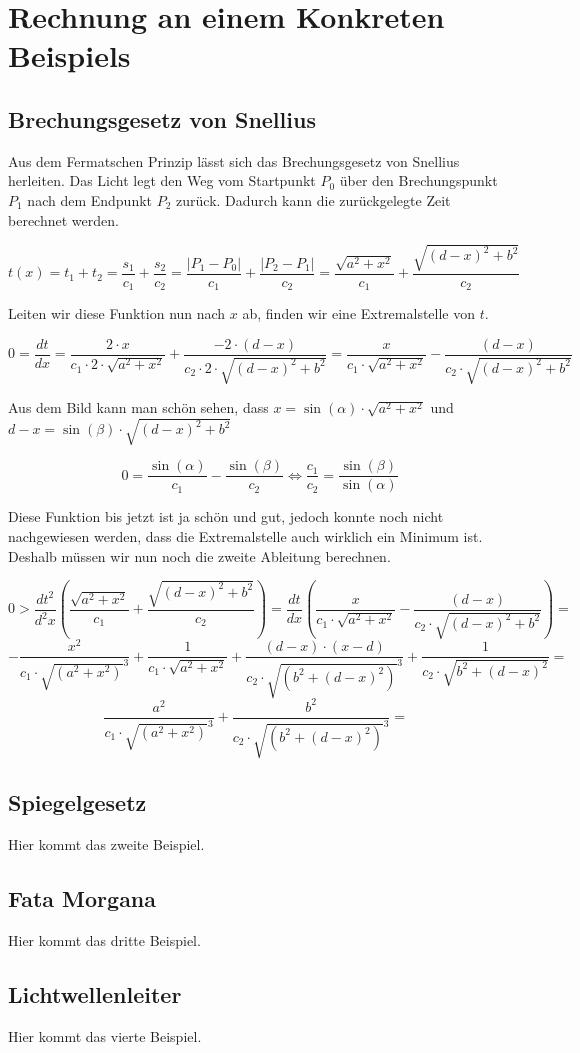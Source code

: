 \section{Rechnung an einem Konkreten Beispiels}

\subsection{Brechungsgesetz von Snellius}
\cite{Snellius}Aus dem Fermatschen Prinzip lässt sich das Brechungsgesetz von Snellius herleiten.
Das Licht legt den Weg vom Startpunkt $P_0$ über den Brechungspunkt $P_1$ 
nach dem Endpunkt $P_2$ zurück. Dadurch kann die zurückgelegte Zeit berechnet werden.



\[
t(x) =
t_1 + t_2 =
\frac{s_1}{c_1} + \frac{s_2}{c_2} =
\frac{|P_1 - P_0|}{c_1} + \frac{|P_2 - P_1|}{c_2} =
\frac{\sqrt{a^2 + x^2}}{c_1} + \frac{\sqrt{(d-x)^2 + b^2}}{c_2}
\]

Leiten wir diese Funktion nun nach $x$ ab, finden wir eine Extremalstelle von $t$.

\[
0 = 
\frac{dt}{dx} =
\frac{2 \cdot x}{c_1 \cdot 2 \cdot \sqrt{a^2 + x^2}} + 
\frac{-2 \cdot (d-x)}{c_2 \cdot 2 \cdot \sqrt{(d-x)^2 + b^2}} =
\frac{x}{c_1 \cdot \sqrt{a^2 + x^2}} - 
\frac{(d-x)}{c_2 \cdot \sqrt{(d-x)^2 + b^2}}
\]

Aus dem Bild kann man schön sehen, dass $x = \sin(\alpha) \cdot \sqrt{a^2 + x^2}$
und $d-x = \sin(\beta) \cdot \sqrt{(d -x)^2 + b^2}$

\[
0 = 
\frac{\sin(\alpha)}{c_1} - \frac{\sin(\beta)}{c_2} \Leftrightarrow
\frac{c_1}{c_2} = \frac{\sin(\beta)}{\sin(\alpha)}
\]

Diese Funktion bis jetzt ist ja schön und gut, 
jedoch konnte noch nicht nachgewiesen werden, 
dass die Extremalstelle auch wirklich ein Minimum ist. 
Deshalb müssen wir nun noch die zweite Ableitung berechnen.

\[
0 > 
\frac{dt^2}{d^2x} \left(\frac{\sqrt{a^2 + x^2}}{c_1} + 
\frac{\sqrt{(d-x)^2 + b^2}}{c_2}\right) =
\frac{dt}{dx} \left(\frac{x}{c_1 \cdot \sqrt{a^2 + x^2}} - 
\frac{(d-x)}{c_2 \cdot \sqrt{(d-x)^2 + b^2}} \right) = \phantom a
\]
\[
- \frac{x^2}{c_1 \cdot \sqrt{(a^2 + x^2)}^{3}}
+ \frac{1}{c_1 \cdot \sqrt{a^2 + x^2}}
+ \frac{(d-x)\cdot(x-d)}{c_2 \cdot \sqrt{(b^2 + (d - x)^2)}^{3}}
+ \frac{1}{c_2 \cdot \sqrt{b^2 + (d-x)^2}} = \phantom a
\]
\[
\frac{a^2}{c_1 \cdot \sqrt{(a^2 + x^2)}^{3}}
+ \frac{b^2}{c_2 \cdot \sqrt{(b^2 + (d - x)^2)}^{3}} = \phantom a
\]

\subsection{Spiegelgesetz}
Hier kommt das zweite Beispiel.

\subsection{Fata Morgana}
Hier kommt das dritte Beispiel.

\subsection{Lichtwellenleiter}

Hier kommt das vierte Beispiel.